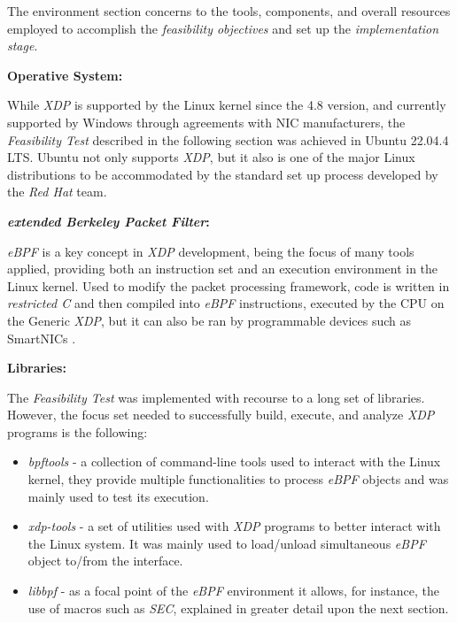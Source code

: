 The environment section concerns to the tools, components, and overall resources employed to accomplish the \textit{feasibility objectives} and set up the \textit{implementation stage}.

\noindent \textbf{Operative System:}

While \textit{XDP} is supported by the Linux kernel since the 4.8 version, and currently supported by Windows through agreements with NIC manufacturers, the \textit{Feasibility Test} described in the following section was achieved in Ubuntu 22.04.4 LTS.
Ubuntu not only supports \textit{XDP}, but it also is one of the major Linux distributions to be accommodated by the standard set up process developed by the \textit{Red Hat} team. 

\noindent \textbf{\textit{extended Berkeley Packet Filter}:}

\textit{eBPF} is a key concept in \textit{XDP} development, being the focus of many tools applied, providing both an instruction set and an execution environment in the Linux kernel.
Used to modify the packet processing framework, code is written in \textit{restricted C} and then compiled into \textit{eBPF} instructions, executed by the CPU on the Generic \textit{XDP}, but it can also be ran by programmable devices such as SmartNICs \cite{FastXDP}.

\noindent \textbf{Libraries:}

The \textit{Feasibility Test} was implemented with recourse to a long set of libraries.
However, the focus set needed to successfully build, execute, and analyze \textit{XDP} programs is the following:
\begin{itemize}
    \item \textit{bpftools} - a collection of command-line tools used to interact with the Linux kernel, they provide multiple functionalities to process \textit{eBPF} objects and was mainly used to test its execution.
    \item \textit{xdp-tools} - a set of utilities used with \textit{XDP} programs to better interact with the Linux system.
    It was mainly used to load/unload simultaneous \textit{eBPF} object to/from the interface.
    \item \textit{libbpf} - as a focal point of the \textit{eBPF} environment it allows, for instance, the use of macros such as \textit{SEC}, explained in greater detail upon the next section. 
\end{itemize}

